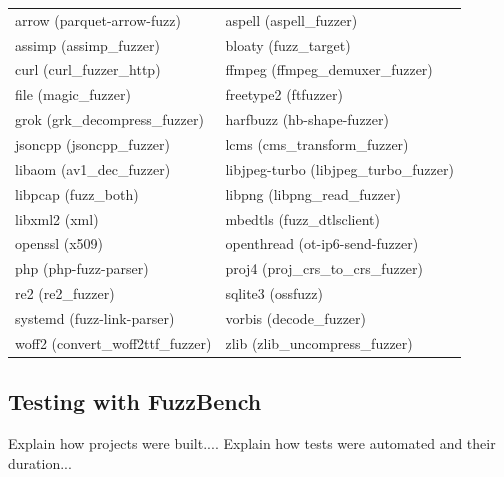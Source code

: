 \noindent
\begin{tabularx}{\textwidth}{
    @{\hspace{2em}}%
    >{\leavevmode\llap{\textbullet~}\raggedright\rule{0pt}{3ex}}%
    X%
    @{\quad\hspace{1em}}%
    >{\leavevmode\llap{\textbullet~}\raggedright\arraybackslash}%
    X%
    @{}%
  }
  arrow (parquet-arrow-fuzz) & aspell (aspell\_fuzzer) \\
  assimp (assimp\_fuzzer) & bloaty (fuzz\_target) \\
  curl (curl\_fuzzer\_http) & ffmpeg (ffmpeg\_demuxer\_fuzzer) \\
  file (magic\_fuzzer) & freetype2 (ftfuzzer) \\
  grok (grk\_decompress\_fuzzer) & harfbuzz (hb-shape-fuzzer) \\
  jsoncpp (jsoncpp\_fuzzer) & lcms (cms\_transform\_fuzzer) \\
  libaom (av1\_dec\_fuzzer) & libjpeg-turbo (libjpeg\_turbo\_fuzzer) \\
  libpcap (fuzz\_both) & libpng (libpng\_read\_fuzzer) \\
  libxml2 (xml) & mbedtls (fuzz\_dtlsclient) \\
  openssl (x509) & openthread (ot-ip6-send-fuzzer) \\
  php (php-fuzz-parser) & proj4 (proj\_crs\_to\_crs\_fuzzer) \\
  re2 (re2\_fuzzer) & sqlite3 (ossfuzz) \\
  systemd (fuzz-link-parser) & vorbis (decode\_fuzzer) \\
  woff2 (convert\_woff2ttf\_fuzzer) & zlib (zlib\_uncompress\_fuzzer)  
\end{tabularx}



\subsection{Testing with FuzzBench}
Explain how projects were built....
Explain how tests were automated and their duration...





